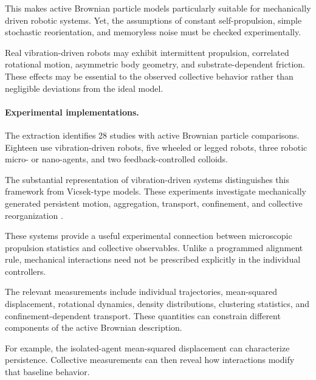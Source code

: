 This makes active Brownian particle
models particularly suitable for
mechanically driven robotic systems.
Yet, the assumptions of constant
self-propulsion, simple stochastic
reorientation, and memoryless noise
must be checked experimentally.

Real vibration-driven robots may exhibit
intermittent propulsion, correlated
rotational motion, asymmetric body
geometry, and substrate-dependent
friction. These effects may be
essential to the observed collective
behavior rather than negligible
deviations from the ideal model.

\paragraph*{Experimental implementations.}

The extraction identifies 28 studies
with active Brownian particle comparisons.
Eighteen use vibration-driven robots,
five wheeled or legged robots,
three robotic micro- or nano-agents,
and two feedback-controlled colloids.

The substantial representation of
vibration-driven systems distinguishes
this framework from Vicsek-type models.
These experiments investigate
mechanically generated persistent
motion, aggregation, transport,
confinement, and collective
reorganization
\cite{Welch2018aggregatesuppressio,Balda2022playingwithactive,Fersula2026aggregatingswarmst,Edwards2026robusttopologically,Musacchio2026activeembracemente,Hoek2026pistonlikeinformat,Arbel2025amechanicalroutef,Fersula2026leveragingdesignfo,MuozObreque2026dynamicsofmagnetic,Musacchio2026fluidizationinduced,Callegari2023playingwithactive,Balda2024playingwithactive,Li2021programmingactivec,Siebers2023exploitingcompositi,Son2024emergentfunctional,Zion2023morphologicalcomput,Wagner2026geometryinducedtra,Zion2021distributedonline}.

These systems provide a useful
experimental connection between
microscopic propulsion statistics
and collective observables.
Unlike a programmed alignment rule,
mechanical interactions need not
be prescribed explicitly in
the individual controllers.

The relevant measurements include
individual trajectories,
mean-squared displacement,
rotational dynamics,
density distributions,
clustering statistics,
and confinement-dependent
transport. These quantities
can constrain different
components of the active
Brownian description.

For example, the isolated-agent
mean-squared displacement
can characterize persistence.
Collective measurements
can then reveal how
interactions modify
that baseline behavior.

